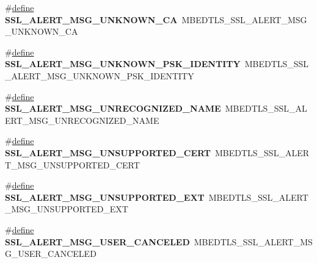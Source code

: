\begin{DoxyCompactItemize}
\item 
\mbox{\label{compat-1_83_8h_aca99d76eb4973ab3f738810886a736f5}} 
\#\hyperlink{structdefine}{define} {\bfseries S\+S\+L\+\_\+\+A\+L\+E\+R\+T\+\_\+\+M\+S\+G\+\_\+\+U\+N\+K\+N\+O\+W\+N\+\_\+\+CA}~M\+B\+E\+D\+T\+L\+S\+\_\+\+S\+S\+L\+\_\+\+A\+L\+E\+R\+T\+\_\+\+M\+S\+G\+\_\+\+U\+N\+K\+N\+O\+W\+N\+\_\+\+CA
\item 
\mbox{\label{compat-1_83_8h_a0ea430b2b401f16bf572c16fa0c8804c}} 
\#\hyperlink{structdefine}{define} {\bfseries S\+S\+L\+\_\+\+A\+L\+E\+R\+T\+\_\+\+M\+S\+G\+\_\+\+U\+N\+K\+N\+O\+W\+N\+\_\+\+P\+S\+K\+\_\+\+I\+D\+E\+N\+T\+I\+TY}~M\+B\+E\+D\+T\+L\+S\+\_\+\+S\+S\+L\+\_\+\+A\+L\+E\+R\+T\+\_\+\+M\+S\+G\+\_\+\+U\+N\+K\+N\+O\+W\+N\+\_\+\+P\+S\+K\+\_\+\+I\+D\+E\+N\+T\+I\+TY
\item 
\mbox{\label{compat-1_83_8h_a00ab2865abf2de37dda6889f1753a984}} 
\#\hyperlink{structdefine}{define} {\bfseries S\+S\+L\+\_\+\+A\+L\+E\+R\+T\+\_\+\+M\+S\+G\+\_\+\+U\+N\+R\+E\+C\+O\+G\+N\+I\+Z\+E\+D\+\_\+\+N\+A\+ME}~M\+B\+E\+D\+T\+L\+S\+\_\+\+S\+S\+L\+\_\+\+A\+L\+E\+R\+T\+\_\+\+M\+S\+G\+\_\+\+U\+N\+R\+E\+C\+O\+G\+N\+I\+Z\+E\+D\+\_\+\+N\+A\+ME
\item 
\mbox{\label{compat-1_83_8h_acab76dfccc5286d385afa9c41a2cbbda}} 
\#\hyperlink{structdefine}{define} {\bfseries S\+S\+L\+\_\+\+A\+L\+E\+R\+T\+\_\+\+M\+S\+G\+\_\+\+U\+N\+S\+U\+P\+P\+O\+R\+T\+E\+D\+\_\+\+C\+E\+RT}~M\+B\+E\+D\+T\+L\+S\+\_\+\+S\+S\+L\+\_\+\+A\+L\+E\+R\+T\+\_\+\+M\+S\+G\+\_\+\+U\+N\+S\+U\+P\+P\+O\+R\+T\+E\+D\+\_\+\+C\+E\+RT
\item 
\mbox{\label{compat-1_83_8h_addf1aa49c1188a3be39aa7138f3f0432}} 
\#\hyperlink{structdefine}{define} {\bfseries S\+S\+L\+\_\+\+A\+L\+E\+R\+T\+\_\+\+M\+S\+G\+\_\+\+U\+N\+S\+U\+P\+P\+O\+R\+T\+E\+D\+\_\+\+E\+XT}~M\+B\+E\+D\+T\+L\+S\+\_\+\+S\+S\+L\+\_\+\+A\+L\+E\+R\+T\+\_\+\+M\+S\+G\+\_\+\+U\+N\+S\+U\+P\+P\+O\+R\+T\+E\+D\+\_\+\+E\+XT
\item 
\mbox{\label{compat-1_83_8h_a42430d65a46a924d2e89cd2909c0783a}} 
\#\hyperlink{structdefine}{define} {\bfseries S\+S\+L\+\_\+\+A\+L\+E\+R\+T\+\_\+\+M\+S\+G\+\_\+\+U\+S\+E\+R\+\_\+\+C\+A\+N\+C\+E\+L\+ED}~M\+B\+E\+D\+T\+L\+S\+\_\+\+S\+S\+L\+\_\+\+A\+L\+E\+R\+T\+\_\+\+M\+S\+G\+\_\+\+U\+S\+E\+R\+\_\+\+C\+A\+N\+C\+E\+L\+ED

\end{DoxyCompactItemize}
